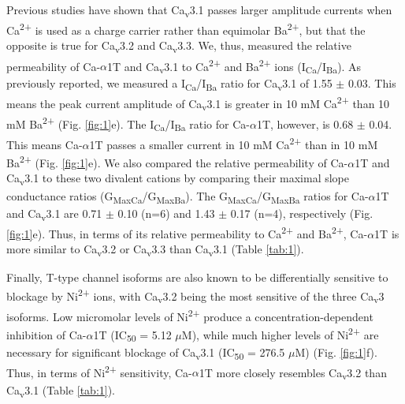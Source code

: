 Previous studies have shown that Ca\textsubscript{v}3.1 passes larger amplitude currents when Ca\textsuperscript{2+} is used as a charge carrier rather than equimolar Ba\textsuperscript{2+}, but that the opposite is true for Ca\textsubscript{v}3.2 and Ca\textsubscript{v}3.3\cite{mcrory:2000aa,shcheglovitov:2007aa}.
We, thus, measured the relative permeability of Ca-$\alpha$1T and Ca\textsubscript{v}3.1 to Ca\textsuperscript{2+} and Ba\textsuperscript{2+} ions (I\textsubscript{Ca}/I\textsubscript{Ba}).
As previously reported, we measured a I\textsubscript{Ca}/I\textsubscript{Ba} ratio for Ca\textsubscript{v}3.1 of 1.55 $\pm$ 0.03. This means the peak current amplitude of Ca\textsubscript{v}3.1 is greater in 10 mM Ca\textsuperscript{2+} than 10 mM Ba\textsuperscript{2+} (Fig. \ref{fig:1}e).
The I\textsubscript{Ca}/I\textsubscript{Ba} ratio for Ca-$\alpha$1T, however, is 0.68 $\pm$ 0.04. This means Ca-$\alpha$1T passes a smaller current in 10 mM Ca\textsuperscript{2+} than in 10 mM Ba\textsuperscript{2+} (Fig. \ref{fig:1}e).
We also compared the relative permeability of Ca-$\alpha$1T and Ca\textsubscript{v}3.1 to these two divalent cations by comparing their maximal slope conductance ratios (G\textsubscript{MaxCa}/G\textsubscript{MaxBa}).
The G\textsubscript{MaxCa}/G\textsubscript{MaxBa} ratios for Ca-$\alpha$1T and Ca\textsubscript{v}3.1 are 0.71 $\pm$ 0.10 (n=6) and 1.43 $\pm$ 0.17 (n=4), respectively (Fig. \ref{fig:1}e).
Thus, in terms of its relative permeability to Ca\textsuperscript{2+} and Ba\textsuperscript{2+}, Ca-$\alpha$1T is more similar to Ca\textsubscript{v}3.2 or Ca\textsubscript{v}3.3 than Ca\textsubscript{v}3.1 (Table \ref{tab:1}).

Finally, T-type channel isoforms are also known to be differentially sensitive to blockage by Ni\textsuperscript{2+} ions, with Ca\textsubscript{v}3.2 being the most sensitive of the three Ca\textsubscript{v}3 isoforms\cite{lee:1999ab}.
Low micromolar levels of Ni\textsuperscript{2+} produce a concentration-dependent inhibition of Ca-$\alpha$1T (IC\textsubscript{50} = 5.12 $\mu$M), while much higher levels of Ni\textsuperscript{2+} are necessary for significant blockage of Ca\textsubscript{v}3.1 (IC\textsubscript{50} = 276.5 $\mu$M) (Fig. \ref{fig:1}f).
Thus, in terms of Ni\textsuperscript{2+} sensitivity, Ca-$\alpha$1T more closely resembles Ca\textsubscript{v}3.2 than Ca\textsubscript{v}3.1 (Table \ref{tab:1}).
